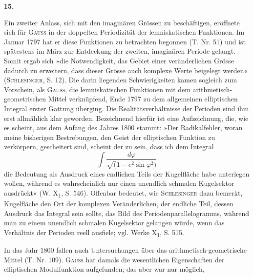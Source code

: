 \clearpage\begingroup{}
\renewcommand{\thefootnote}{\arabic{footnote})}\setcounter{footnote}{0}
\begin{center}
\textbf{15.}\par\smallskip
{}
\end{center}
\noindent\hspace*{\parindent}Ein zweiter Anlass, sich mit den imaginären Grössen zu beschäftigen,
eröffnete sich für \textsc{Gauss} in der doppelten Periodizität der lemniskatischen
Funktionen. Im Januar 1797 hat er diese Funktionen zu betrachten begonnen
(T. Nr. 51) und ist spätestens im März zur Entdeckung der zweiten,
imaginären Periode gelangt. Somit ergab sich »die Notwendigkeit, das Gebiet
einer veränderlichen Grösse dadurch zu erweitern, dass dieser Grösse auch
komplexe Werte beigelegt werden« (\textsc{Schlesinger}, S. 12). Die darin liegenden
Schwierigkeiten kamen sogleich zum Vorschein, als \textsc{Gauss}, die lemniskatischen
Funktionen mit dem arithmetisch-geometrischen Mittel verknüpfend, Ende
1797 zu dem allgemeinen elliptischen Integral erster Gattung überging. Die
Realitätsverhältnisse der Perioden sind ihm erst allmählich klar geworden.
Bezeichnend hierfür ist eine Aufzeichnung, die, wie es scheint, aus dem Anfang
des Jahres 1800 stammt: »Der Radikalfehler, woran meine bisherigen
Bestrebungen, den Geist der elliptischen Funktion zu verkörpern, gescheitert
sind, scheint der zu sein, dass ich dem Integral
\[
\int\frac{d\varphi}{\surd(1-e^2\sin\varphi^2)}
\]
\noindent die Bedeutung als Ausdruck eines endlichen Teils der Kugelfläche habe unterlegen
wollen, während es wahrscheinlich nur einen unendlich schmalen
\clearpage{}\setcounter{footnote}{0}
\noindent Kugelsektor ausdrückt« (W. X\textsubscript{1}, S. 546). Offenbar bedeutet, wie \textsc{Schlesinger} dazu
bemerkt, Kugelfläche den Ort der komplexen Veränderlichen, der endliche
Teil, dessen Ausdruck das Integral sein sollte, das Bild des Periodenparallelogramms,
während man zu einem unendlich schmalen Kugelsektor gelangen
würde, wenn das Verhältnis der Perioden reell ausfiele; vgl. Werke X\textsubscript{1}, S. 515.
\par
In das Jahr 1800 fallen auch Untersuchungen über das arithmetisch-geometrische
Mittel (T. Nr. 109). \textsc{Gauss} hat damals die wesentlichen Eigenschaften
der elliptischen Modulfunktion aufgefunden; das aber war nur möglich,
